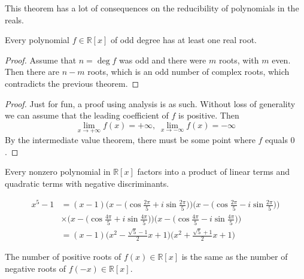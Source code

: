   This theorem has a lot of consequences on the reducibility of polynomials in the reals. 

  \begin{corollary}
    Every polynomial $f \in \mathbb{R}[x]$ of odd degree has at least one real root. 
  \end{corollary}
  \begin{proof}
    Assume that $n = \deg{f}$ was odd and there were $m$ roots, with $m$ even. Then there are $n - m$ roots, which is an odd number of complex roots, which contradicts the previous theorem. 
  \end{proof}
  \begin{proof}
    Just for fun, a proof using analysis is as such. Without loss of generality we can assume that the leading coefficient of $f$ is positive. Then
    \begin{equation}
      \lim_{x \rightarrow + \infty} f(x) = + \infty, \; \lim_{x \rightarrow -\infty} f(x) = -\infty
    \end{equation}
    By the intermediate value theorem, there must be some point where $f$ equals $0$. 
  \end{proof}

  \begin{corollary}
    Every nonzero polynomial in $\mathbb{R}[x]$ factors into a product of linear terms and quadratic terms with negative discriminants. 
  \end{corollary}

  \begin{example}
    \begin{align*}
      x^5 - 1 & = (x-1) \bigg( x - \Big( \cos{\frac{2\pi}{5}} + i \sin{\frac{2\pi}{5}}\Big) \bigg) \bigg( x - \Big( \cos{\frac{2\pi}{5}} - i \sin{\frac{2\pi}{5}}\Big) \bigg) \\
      & \times \bigg( x - \Big( \cos{\frac{4\pi}{5}} + i \sin{\frac{4\pi}{5}}\Big) \bigg) \bigg( x - \Big( \cos{\frac{4\pi}{5}} - i \sin{\frac{4\pi}{5}}\Big) \bigg) \\
      & = (x-1) \bigg( x^2 - \frac{\sqrt{5} - 1}{2} x + 1\bigg) \bigg( x^2 + \frac{\sqrt{5} + 1}{2} x + 1\bigg) 
    \end{align*}
  \end{example}

  \begin{lemma}
    The number of positive roots of $f(x) \in \mathbb{R}[x]$ is the same as the number of negative roots of $f(-x) \in \mathbb{R}[x]$.
  \end{lemma}

